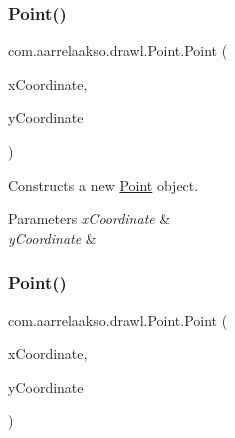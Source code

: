 \subsubsection{\texorpdfstring{Point()}{Point()}\hspace{0.1cm}{\footnotesize\ttfamily [1/3]}}
{\footnotesize\ttfamily com.\+aarrelaakso.\+drawl.\+Point.\+Point (\begin{DoxyParamCaption}\item[{final \hyperlink{interfacecom_1_1aarrelaakso_1_1drawl_1_1_number}{Number}}]{x\+Coordinate,  }\item[{final \hyperlink{interfacecom_1_1aarrelaakso_1_1drawl_1_1_number}{Number}}]{y\+Coordinate }\end{DoxyParamCaption})\hspace{0.3cm}{\ttfamily [protected]}}



Constructs a new \hyperlink{classcom_1_1aarrelaakso_1_1drawl_1_1_point}{Point} object. 


\begin{DoxyParams}{Parameters}
{\em x\+Coordinate} & \\
\hline
{\em y\+Coordinate} & \\
\hline
\end{DoxyParams}
\mbox{\label{classcom_1_1aarrelaakso_1_1drawl_1_1_point_afb3376a5897946911a2230562fff07cf}} 
\subsubsection{\texorpdfstring{Point()}{Point()}\hspace{0.1cm}{\footnotesize\ttfamily [2/3]}}
{\footnotesize\ttfamily com.\+aarrelaakso.\+drawl.\+Point.\+Point (\begin{DoxyParamCaption}\item[{@Not\+Null final Integer}]{x\+Coordinate,  }\item[{@Not\+Null final Integer}]{y\+Coordinate }\end{DoxyParamCaption})\hspace{0.3cm}{\ttfamily [protected]}}

\mbox{\label{classcom_1_1aarrelaakso_1_1drawl_1_1_point_acccdd3d1aeb08cc4315d415a546a3d95}} 
